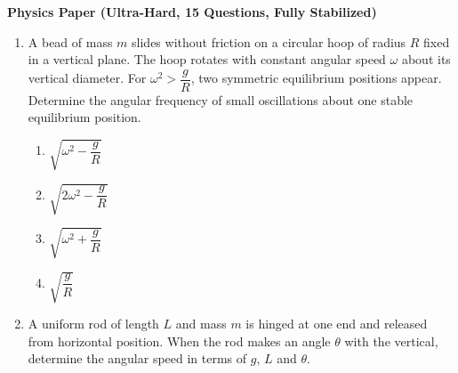 \documentclass[12pt]{article}
\begin{document}
\begin{center}
\Large \textbf{Physics Paper (Ultra-Hard, 15 Questions, Fully Stabilized)}
\end{center}

\begin{enumerate}

\item A bead of mass $m$ slides without friction on a circular hoop of radius $R$ fixed in a vertical plane. The hoop rotates with constant angular speed $\omega$ about its vertical diameter. For $\omega^2 > \dfrac{g}{R}$, two symmetric equilibrium positions appear. Determine the angular frequency of small oscillations about one stable equilibrium position.

\begin{center}
\end{center}

\begin{enumerate}
\item $\sqrt{\omega^2-\dfrac{g}{R}}$
\item $\sqrt{2\omega^2-\dfrac{g}{R}}$
\item $\sqrt{\omega^2+\dfrac{g}{R}}$
\item $\sqrt{\dfrac{g}{R}}$
\end{enumerate}

\item A uniform rod of length $L$ and mass $m$ is hinged at one end and released from horizontal position. When the rod makes an angle $\theta$ with the vertical, determine the angular speed in terms of $g$, $L$ and $\theta$.

\end{enumerate}
\end{document}
